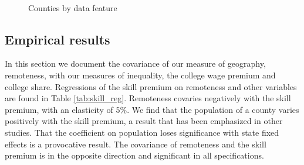 \documentclass[12 pt]{article}
\begin{document}
\begin{figure}[!ht]
  \centering
  \quad
  \\
  \quad
  \caption{Counties by data feature}
  \label{fig:geo}
\end{figure}

\subsection{Empirical results}
In this section we document the covariance of our measure of geography, remoteness, with our measures of inequality, the college wage premium and college share.  Regressions of the skill premium on remoteness and other variables are found in Table \ref{tab:skill_reg}.  Remoteness covaries negatively with the skill premium, with an elasticity of 5\%.  We find that the population of a county varies positively with the skill premium, a result that has been emphasized in other studies.  That the coefficient on population loses significance with state fixed effects is a provocative result.  The covariance of remoteness and the skill premium is in the opposite direction and significant in all specifications.
\end{document}
